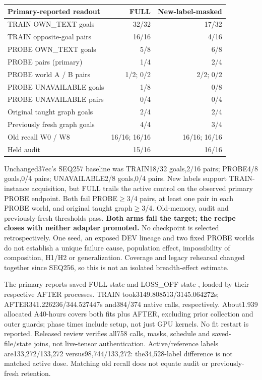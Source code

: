 \documentclass{article}
\begin{document}
\begin{center}
\small
\begin{tabular}{lrr}
\toprule
Primary-reported readout & FULL & New-label-masked \\
\midrule
TRAIN OWN\_TEXT goals & 32/32 & 17/32 \\
TRAIN opposite-goal pairs & 16/16 & 4/16 \\
PROBE OWN\_TEXT goals & 5/8 & 6/8 \\
PROBE pairs (primary) & 1/4 & 2/4 \\
PROBE world A / B pairs & 1/2; 0/2 & 2/2; 0/2 \\
PROBE UNAVAILABLE goals & 1/8 & 0/8 \\
PROBE UNAVAILABLE pairs & 0/4 & 0/4 \\
Original taught graph goals & 2/4 & 2/4 \\
Previously fresh graph goals & 4/4 & 3/4 \\
Old recall W0 / W8 & 16/16; 16/16 & 16/16; 16/16 \\
Held audit & 15/16 & 16/16 \\
\bottomrule
\end{tabular}
\end{center}

Unchanged37ec's SEQ257 baseline was TRAIN18/32 goals,2/16 pairs; PROBE4/8
goals,0/4 pairs; UNAVAILABLE2/8 goals,0/4 pairs. New labels support TRAIN-instance
acquisition, but FULL trails the active control on the observed primary PROBE
endpoint. Both fail PROBE$\geq$3/4 pairs, at least one pair in each PROBE world,
and original taught graph$\geq$3/4. Old-memory, audit and previously-fresh
thresholds pass. \textbf{Both arms fail the target; the recipe closes with neither
adapter promoted.} No checkpoint is selected retrospectively. One seed, an
exposed DEV lineage and two fixed PROBE worlds do not establish a unique failure
cause, population effect, impossibility of composition, H1/H2 or generalization.
Coverage and legacy rehearsal changed together since SEQ256, so this is not an
isolated breadth-effect estimate.

The primary reports saved FULL state
and LOSS\_OFF state
,
loaded by their respective AFTER processes. TRAIN took3149.808513/3145.064272s;
AFTER341.226236/344.527447s and384/374 native calls, respectively. About1.939
allocated A40-hours covers both fits plus AFTER, excluding prior collection and
outer guards; phase times include setup, not just GPU kernels. No fit restart
is reported. Released review verifies all758 calls, masks, schedule and
saved-file/state joins, not live-tensor authentication. Active/reference
labels are133,272/133,272 versus98,744/133,272: the34,528-label difference
is not matched active dose. Matching old recall does not equate audit or
previously-fresh retention.
\end{document}
